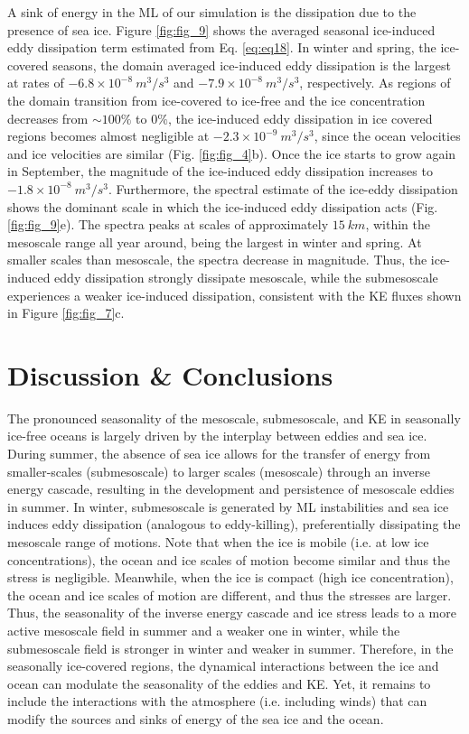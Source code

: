 \documentclass[draft]{agujournal2019}
\begin{document}
A sink of energy in the ML of our simulation is the dissipation due to the presence of sea ice. Figure \ref{fig:fig_9} shows the averaged seasonal ice-induced eddy dissipation term estimated from Eq. \ref{eq:eq18}. In winter and spring, the ice-covered seasons, the domain averaged ice-induced eddy dissipation is the largest at rates of $-6.8\times10^{-8}\ m^3/s^{3}$ and $-7.9 \times10^{-8}\ m^3/s^{3}$, respectively. As regions of the domain transition from ice-covered to ice-free and the ice concentration decreases from $\sim 100\%$ to $0\%$, the ice-induced eddy dissipation in ice covered regions becomes almost negligible at $-2.3\times10^{-9}\ m^3/s^{3}$, since the ocean velocities and ice velocities are similar (Fig. \ref{fig:fig_4}b). Once the ice starts to grow again in September, the magnitude of the ice-induced eddy dissipation increases to $-1.8\times10^{-8}\ m^3/s^{3}$. Furthermore, the spectral estimate of the ice-eddy dissipation shows the dominant scale in which the ice-induced eddy dissipation acts (Fig. \ref{fig:fig_9}e). The spectra peaks at scales of approximately $15\ km$, within the mesoscale range all year around, being the largest in winter and spring. At smaller scales than mesoscale, the spectra decrease in magnitude. Thus, the ice-induced eddy dissipation strongly dissipate mesoscale, while the submesoscale experiences a weaker ice-induced dissipation, consistent with the KE fluxes shown in Figure \ref{fig:fig_7}c.

\section{Discussion \& Conclusions}
\label{conclusions}

The pronounced seasonality of the mesoscale, submesoscale, and KE in seasonally ice-free oceans is largely driven by the interplay between eddies and sea ice. During summer, the absence of sea ice allows for the transfer of energy from smaller-scales (submesoscale) to larger scales (mesoscale) through an inverse energy cascade, resulting in the development and persistence of mesoscale eddies in summer. In winter, submesoscale is generated by ML instabilities and sea ice induces eddy dissipation (analogous to eddy-killing), preferentially dissipating the mesoscale range of motions. Note that when the ice is mobile (i.e. at low ice concentrations), the ocean and ice scales of motion become similar and thus the stress is negligible. Meanwhile, when the ice is compact (high ice concentration), the ocean and ice scales of motion are different, and thus the stresses are larger. Thus, the seasonality of the inverse energy cascade and ice stress leads to a more active mesoscale field in summer and a weaker one in winter, while the submesoscale field is stronger in winter and weaker in summer. Therefore, in the seasonally ice-covered regions, the dynamical interactions between the ice and ocean can modulate the seasonality of the eddies and KE. Yet, it remains to include the interactions with the atmosphere (i.e. including winds) that can modify the sources and sinks of energy of the sea ice and the ocean. 
\end{document}
